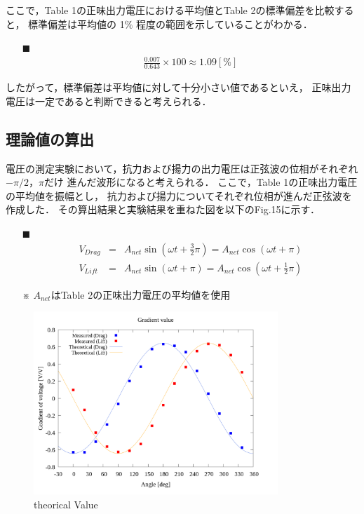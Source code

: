 \documentclass[twocolumn,a4j]{jsarticle}
\begin{document}
ここで，Table 1の正味出力電圧における平均値とTable 2の標準偏差を比較すると，
標準偏差は平均値の 1$\%$ 程度の範囲を示していることがわかる．

\begin{itemize}
    \item [$\blacksquare$] 
    \begin{eqnarray*}
        \frac{0.007}{0.643} × 100 \approx 1.09 [\%]
    \end{eqnarray*}
\end{itemize}

したがって，標準偏差は平均値に対して十分小さい値であるといえ，
正味出力電圧は一定であると判断できると考えられる．

\newpage

\subsection{理論値の算出}
電圧の測定実験において，抗力および揚力の出力電圧は正弦波の位相がそれぞれ$-\pi/2$，$\pi$だけ
進んだ波形になると考えられる．
ここで，Table 1の正味出力電圧の平均値を振幅とし，
抗力および揚力についてそれぞれ位相が進んだ正弦波を作成した．
その算出結果と実験結果を重ねた図を以下のFig.15に示す．

\begin{itemize}
    \item [$\blacksquare$] 
    \begin{eqnarray*}
        V_{Drag} &=& A_{net} \sin\left(\omega t + \frac{3}{2}\pi\right) = A_{net} \cos\left(\omega t + \pi\right)\\
        V_{Lift} &=& A_{net} \sin\left(\omega t + \pi\right) = A_{net} \cos\left(\omega t + \frac{1}{2}\pi\right)
    \end{eqnarray*}
    \item [※] $A_{net}$はTable 2の正味出力電圧の平均値を使用
\end{itemize}

\begin{figure}[htbp]
    \footnotesize
    \begin{center}
        \includegraphics[width=92mm]{../images_2/20/20_adjust-value.png}
        \caption{theorical Value}
    \end{center}
\end{figure}
\end{document}
